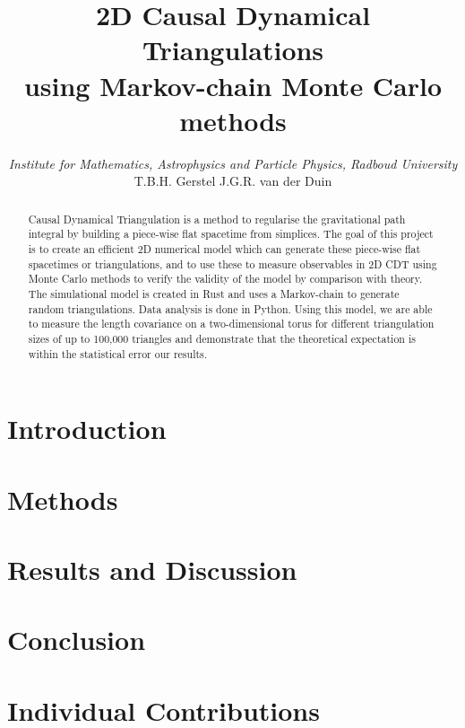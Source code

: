 \documentclass{article}
\title{{\huge 2D Causal Dynamical Triangulations} \\ {\Large using Markov-chain Monte Carlo methods}}
\author{\textit{Institute for Mathematics, Astrophysics and Particle Physics, Radboud University} \\[1mm] T.B.H. Gerstel \hspace{1cm} J.G.R. van der Duin}
\begin{document}
\maketitle

\begin{abstract} %
    Causal Dynamical Triangulation is a method to regularise the gravitational path integral by building a piece-wise flat spacetime from simplices.
    The goal of this project is to create an efficient 2D numerical model which can generate these piece-wise flat spacetimes or triangulations, and to use these to measure observables in 2D CDT using Monte Carlo methods to verify the validity of the model by comparison with theory.
    The simulational model is created in Rust and uses a Markov-chain to generate random triangulations. Data analysis is done in Python.
    Using this model, we are able to measure the length covariance on a two-dimensional torus for different triangulation sizes of up to 100,000 triangles and demonstrate that the theoretical expectation is within the statistical error our results.
\end{abstract}

\newpage

\section{Introduction}


\section{Methods}


\section{Results and Discussion}


\section{Conclusion}


\printbibliography

\appendix
\section{Individual Contributions}
\end{document}
